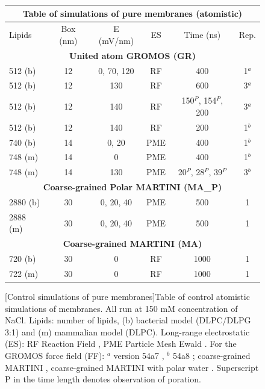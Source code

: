 \begin{figure}[h!]
\centering
\vspace{1cm}
\scriptsize
 \def\arraystretch{1.6}
\begin{tabular}{lccccc}
 \multicolumn{6}{c}{\small \textbf{Table of simulations of pure membranes (atomistic)}} \\
  \hline
 Lipids & Box (nm) & E (mV/nm) & ES & $\,$Time (ns)$\,$ & Rep. \\
 \hline
 \multicolumn{6}{c}{\textbf{United atom GROMOS (GR)}} \\
 512 (b) & 12 & 0, 70, 120 	& RF & 400 							& 1$^a$ \\
 512 (b) & 12 & 130 			& RF & 600 							& 3$^a$ \\
 512 (b) & 12 & 140 			& RF & 150$^{P}$, 154$^{P}$, 200 	& 3$^a$ \\
 512 (b) & 12 & 140 			& RF & 200 							& 1$^b$ \\
 740 (b) & 14 & 0, 20		& PME & 400 							& 1$^b$ \\
 748 (m) & 14 & 0			& PME & 400							& 1$^b$ \\
 748 (m) & 14 & 130 			& PME & 20$^{P}$, 28$^{P}$, 39$^{P}$ & 3$^b$ \\
 \hline
 \multicolumn{6}{c}{\textbf{Coarse-grained Polar MARTINI (MA\_P)}} \\
 2880 (b) & 30 & 0, 20, 40 & PME & 500 & 1 \\
 2888 (m) & 30 & 0, 20, 40 & PME & 500 & 1 \\
 \hline
 \multicolumn{6}{c}{\textbf{Coarse-grained MARTINI (MA)}} \\
 720 (b) & 30 & 0 & RF & 1000 & 1 \\
 722 (m) & 30 & 0 & RF & 1000 & 1 \\
 \hline
\end{tabular}
\vspace{0.5cm}
[Control simulations of pure membranes]{Table of control atomistic simulations of membranes. All run at 150 mM concentration of NaCl. 
%
Lipids: number of lipids, (b) bacterial model (DLPC/DLPG 3:1) and (m) mammalian model (DLPC).
%
Long-range electrostatic (ES): RF Reaction Field \citep{Tironi1995}, PME Particle Mesh Ewald \citep{Essmann1995}.
%
For the GROMOS force field (FF): $^a$ version 54a7 \citep{Schmid2011}, $^b$ 54a8 \citep{Reif2012}; coarse-grained MARTINI \citep{Marrink2007, Monticelli2008}, coarse-grained MARTINI with polar water \citep{Yesylevskyy2010}.
%
Superscript P in the time length denotes observation of poration.}
\label{table:SI_membrane}
\end{figure}
